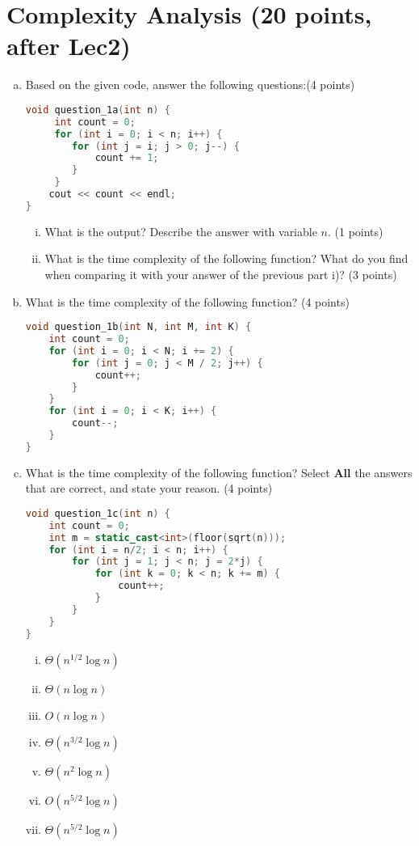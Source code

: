\documentclass[11pt]{exam}
\begin{document}
\section{Complexity Analysis (20 points, after Lec2)}

\begin{enumerate}[(a)]

\item Based on the given code, answer the following questions:(4 points)
\begin{lstlisting}[language=c++]
void question_1a(int n) {
	 int count = 0;
	 for (int i = 0; i < n; i++) {
	 	for (int j = i; j > 0; j--) {
	 		count += 1;
	 	}
	 }
	cout << count << endl;
}
\end{lstlisting}
\begin{enumerate}[i)]
\item What is the output? Describe the answer with variable $n$. (1 points)
\item What is the time complexity of the following function? What do you find when comparing it with your answer of the previous part i)? (3 points)
\end{enumerate}

\begin{solution}
\end{solution}

\item What is the time complexity of the following function? (4 points)
\begin{lstlisting}[language=c++]
void question_1b(int N, int M, int K) {
	int count = 0;
	for (int i = 0; i < N; i += 2) {
		for (int j = 0; j < M / 2; j++) {
			count++;
		}
	}
	for (int i = 0; i < K; i++) {
		count--;
	}
}
\end{lstlisting}

\begin{solution}
\end{solution}

\item What is the time complexity of the following function? Select \textbf{All} the answers that are correct, and state your reason.  (4 points)
\begin{lstlisting}[language=c++]
void question_1c(int n) {
	int count = 0;
	int m = static_cast<int>(floor(sqrt(n)));
	for (int i = n/2; i < n; i++) {
		for (int j = 1; j < n; j = 2*j) {
			for (int k = 0; k < n; k += m) {
				count++;
			}
		}
	}
}
\end{lstlisting}
\begin{enumerate}[i)]
\item $\Theta(n^{1/2}\log n)$
\item $\Theta(n \log n)$
\item $O(n \log n)$
\item $\Theta(n^{3/2}\log n)$
\item $\Theta(n^2\log n)$
\item $O(n^{5/2}\log n)$
\item $\Theta(n^{5/2}\log n)$
\end{enumerate}
\begin{solution}
\end{solution}


\end{enumerate}
\end{document}
